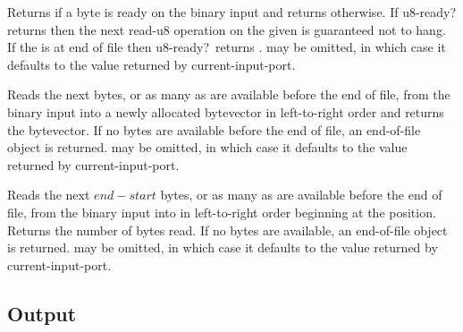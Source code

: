 \begin{entry}{%
}

Returns \schtrue{} if a byte is ready on the binary input 
and returns \schfalse{} otherwise.  If {\cf u8-ready?} returns
\schtrue{} then the next {\cf read-u8} operation on the given
 is guaranteed not to hang.  If the  is at end of
file then {\cf u8-ready?}\ returns \schtrue.   may be
omitted, in which case it defaults to the value returned by {\cf
  current-input-port}.

\end{entry}

\begin{entry}{%
}

Reads the next  bytes, or as many as are available before the end of file,
from the binary
input  into a newly allocated bytevector in left-to-right order
and returns the bytevector.
If no bytes are available before the end of file,
an end-of-file object is returned.
 may be
omitted, in which case it defaults to the value returned by {\cf
  current-input-port}.

\end{entry}

\begin{entry}{%
}

Reads the next $end - start$ bytes, or as many as are available
before the end of file,
from the binary
input  into  in left-to-right order
beginning at the  position.
Returns the number of bytes read.
If no bytes are available, an end-of-file object is returned.
 may be
omitted, in which case it defaults to the value returned by {\cf
  current-input-port}.

\end{entry}


\subsection{Output}
\label{outputsection}

\noindent \hbox{}
\vspace{-5ex}

